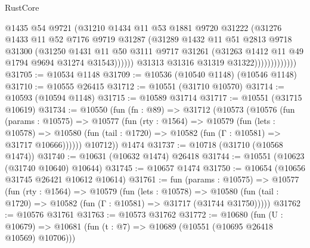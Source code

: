 \begin{lexlean}{RustCore}
\begin{coremodule}
                                @1435
                                @54
                                @9721
                                (@31210
                                  @1434
                                  @11
                                  @53
                                  @1881
                                  @9720
                                  @31222
                                  (@31276
                                    @1433
                                    @11
                                    @52
                                    @7176
                                    @9719
                                    @31287
                                    (@31289
                                      @1432
                                      @11
                                      @51
                                      @2813
                                      @9718
                                      @31300
                                      (@31250
                                        @1431
                                        @11
                                        @50
                                        @3111
                                        @9717
                                        @31261
                                        (@31263 @1412 @11 @49 @1794 @9694 @31274 @31543))))))
                              @31313
                              @31316
                              @31319
                              @31322)))))))))))))
@31705 := @10534 @1148
@31709 := @10536 (@10540 @1148) (@10546 @1148)
@31710 := @10555 @26415
@31712 := @10551 (@31710 @10570)
@31714 := @10593 (@10594 @1148)
@31715 := @10589 @31714
@31717 := @10551 (@31715 @10619)
@31734 := @10550
    (fun (fn : @89) =>
    @31712
      (@10573
        (@10576
          (fun (params : @10575) =>
          @10577
            (fun (rty : @1564) =>
            @10579
              (fun (lets : @10578) =>
              @10580 (fun (tail : @1720) => @10582 (fun (Γ : @10581) => @31717 @10666))))))
        @10712))
    @1474
@31737 := @10718 (@31710 (@10568 @1474))
@31740 := @10631 (@10632 @1474) @26418
@31744 := @10551 (@10623 (@31740 @10640) @10644)
@31745 := @10657 @1474
@31750 := @10654 (@10656 @31745 @26421 @10612 @10614)
@31761 := fun (params : @10575) =>
  @10577
    (fun (rty : @1564) =>
    @10579
      (fun (lets : @10578) =>
      @10580 (fun (tail : @1720) => @10582 (fun (Γ : @10581) => @31717 (@31744 @31750)))))
@31762 := @10576 @31761
@31763 := @10573 @31762
@31772 := @10680
    (fun (U : @10679) => @10681 (fun (t : @7) => @10689 (@10551 (@10695 @26418 @10569) @10706)))

\end{coremodule}
\end{lexlean}
